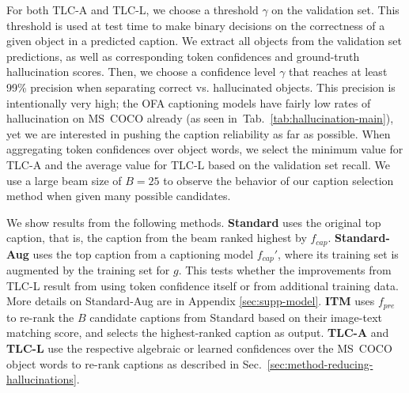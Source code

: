 \documentclass[10pt,twocolumn,letterpaper]{article}
\newcommand{\tabref}[1]{Tab.\xspace~\ref{#1}}
\newcommand{\secref}[1]{Sec.\xspace~\ref{#1}}
\newcommand{\ApproachName}{TLC\xspace}
\begin{document}
For both \ApproachName-A and \ApproachName-L, we choose a threshold $\gamma$ on the validation set. This threshold is used at test time to make binary decisions on the correctness of a given object in a predicted caption. We extract all objects from the validation set predictions, as well as corresponding token confidences and ground-truth hallucination scores. Then, we choose a confidence level $\gamma$ that reaches at least 99\% precision when separating correct vs. hallucinated objects. This precision is intentionally very high; the OFA captioning models have fairly low rates of hallucination on MS~COCO already (as seen in~\tabref{tab:hallucination-main}), yet we are interested in pushing the caption reliability as far as possible. When aggregating token confidences over object words, we select the minimum value for \ApproachName-A and the average value for \ApproachName-L based on the validation set recall. We use a large beam size of $B = 25$ to observe the behavior of our caption selection method when given many possible candidates.

We show results from the following methods. \textbf{Standard} uses the original top caption, that is, the caption from the beam ranked highest by $f_{\mathit{cap}}$. \textbf{Standard-Aug} uses the top caption from a captioning model $f_{\mathit{cap}}'$, where its training set is augmented by the training set for $g$. This tests whether the improvements from \ApproachName-L result from using token confidence itself or from additional training data. More details on Standard-Aug are in Appendix \ref{sec:supp-model}. \textbf{ITM} uses $f_{\mathit{pre}}$ to re-rank the $B$ candidate captions from Standard based on their image-text matching score, and selects the highest-ranked caption as output. \textbf{\ApproachName-A} and \textbf{\ApproachName-L} use the respective algebraic or learned confidences over the MS~COCO object words to re-rank captions as described in \secref{sec:method-reducing-hallucinations}.
\end{document}
